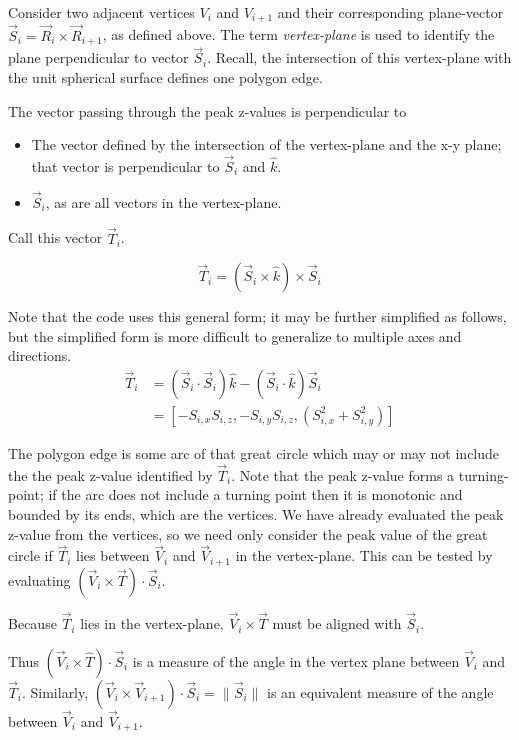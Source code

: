 \documentclass[11pt,fleqn]{report}
\begin{document}
Consider two adjacent vertices $V_i$ and $V_{i+1}$ and their corresponding
plane-vector $\vec S_i = \vec R_i \times \vec R_{i+1}$, as defined above.
The term \textit{vertex-plane}  is used to identify the plane perpendicular
to vector $\vec S_i$.
Recall, the intersection of this vertex-plane with the unit spherical
surface defines one polygon edge.

The vector passing through the peak z-values is perpendicular to
\begin{itemize}
  \item The vector defined by the intersection of the vertex-plane and the
    x-y plane; that vector is perpendicular to $\vec S_i$ and $\hat k$.
  \item $\vec S_i$, as are all vectors in the vertex-plane.
\end{itemize}
Call this vector $\vec T_i$.

\begin {equation*}
\vec T_i = \left( \vec S_i \times \hat k \right)\times \vec S_i
\end {equation*}

Note that the code uses this general form; it may be further simplified as
follows, but the simplified form is more difficult to generalize to multiple
axes and directions.
\begin {align*}
\vec T_i 
       &= (\vec S_i \cdot \vec S_i) \hat k - (\vec S_i \cdot \hat k) \vec S_i \\
       &= [-S_{i,x} S_{i,z}, -S_{i,y} S_{i,z}, (S_{i,x}^2 + S_{i,y}^2)]
\end {align*}


The polygon edge is some arc of that great circle which may or may not
include the the peak z-value identified by $\vec T_i$.
Note that the peak z-value forms a turning-point; if the arc does not
include a turning point then it is monotonic and bounded by its ends,
which are the vertices. We have already
evaluated the peak z-value from the vertices, so we need only consider the
peak value of the great circle if $\vec T_i$ lies between $\vec V_i$ and
$\vec V_{i+1}$ in the vertex-plane. This can be tested by evaluating
$\left( \vec V_i \times \vec T \right) \cdot \vec S_i$.

Because $\vec T_i$ lies in the vertex-plane, $\vec V_i \times \vec T$ must be
aligned with $\vec S_i$.

Thus $\left( \vec V_i \times \hat T \right) \cdot \vec S_i$ is a measure of the
angle in the vertex plane between $\vec V_i$ and $\vec T_i$. Similarly,
$\left( \vec V_i \times \vec V_{i+1} \right) \cdot \vec S_i =
\lVert\vec S_i \rVert$ is an equivalent measure of the angle between
$\vec V_i$ and
$\vec V_{i+1}$.
\end{document}
